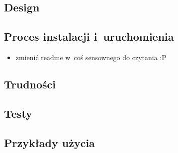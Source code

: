 \subsection{Design}
\subsection{Proces instalacji i~uruchomienia}
   \begin{itemize}
    \item zmienić readme w~coś sensownego do czytania :P
    
\end{itemize} 
\subsection{Trudności}
\subsection{Testy}
\subsection{Przykłady użycia}